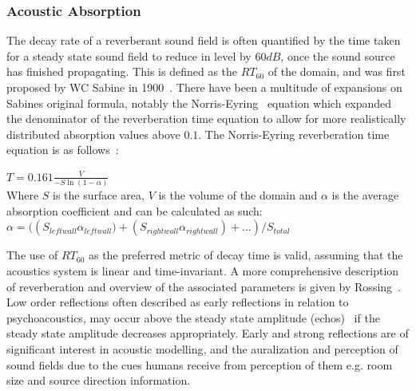 \subsubsection{Acoustic Absorption}
The decay rate of a reverberant sound field is often quantified by the time taken for a steady state sound field to reduce in level by $60{dB}$, once the sound source has finished propagating. This is defined as the $RT_{60}$ of the domain, and was first proposed by WC Sabine in 1900~\cite{Everest2009}. There have been a multitude of expansions on Sabines original formula, notably the Norris-Eyring~\cite{Beranek2006} equation which expanded the denominator of the reverberation time equation to allow for more realistically distributed absorption values above $0.1$. The Norris-Eyring reverberation time equation is as follows~\cite{Davis2014}:\\
\begin{center}
$T = 0.161\frac{V}{-S \ln(1 - \alpha)} $\\
Where $S$ is the surface area, $V$ is the volume of the domain and $\alpha$ is the average absorption coefficient and can be calculated as such:\\
$\alpha = (\left( S_{leftwall} \alpha_{leftwall})+(S_{rightwall} \alpha_{rightwall})+... \right) /S_{total}$ \\
\end{center}
The use of $RT_{60}$ as the preferred metric of decay time is valid, assuming that the acoustics system is linear and time-invariant.
A more comprehensive description of reverberation and overview of the associated parameters is given by Rossing~\cite{rossing2007springer}. \\

Low order reflections often described as early reflections in relation to psychoacoustics, may occur above the steady state amplitude (echos)~\cite{Everest2009} if the steady state amplitude decreases appropriately. Early and strong reflections are of significant interest in acoustic modelling, and the auralization and perception of sound fields due to the cues humans receive from perception of them e.g. room size and source direction information.\\

